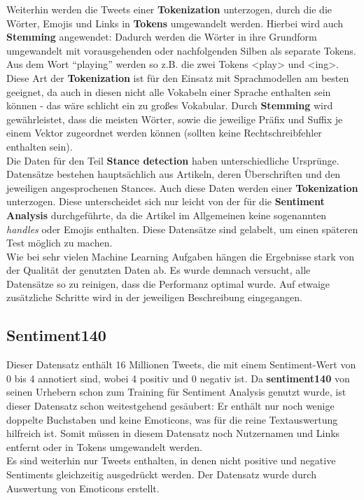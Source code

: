 Weiterhin werden die Tweets einer \textbf{Tokenization} unterzogen, durch die die W\"orter, Emojis und Links in \textbf{Tokens} umgewandelt werden. Hierbei wird auch \textbf{Stemming} angewendet: Dadurch werden die W\"orter in ihre Grundform umgewandelt mit vorausgehenden oder nachfolgenden Silben als separate Tokens. Aus dem Wort "`playing"' werden so z.B. die zwei Tokens <play> und <ing>. Diese Art der \textbf{Tokenization} ist f\"ur den Einsatz mit Sprachmodellen am besten geeignet, da auch in diesen nicht alle Vokabeln einer Sprache enthalten sein k\"onnen - das w\"are schlicht ein zu gro{\ss}es Vokabular. Durch \textbf{Stemming} wird gew\"ahrleistet, dass die meisten W\"orter, sowie die jeweilige Pr\"afix und Suffix je einem Vektor zugeordnet werden k\"onnen (sollten keine Rechtschreibfehler enthalten sein).\\
Die Daten f\"ur den Teil \textbf{Stance detection} haben unterschiedliche Urspr\"unge. Datens\"atze bestehen haupts\"achlich aus Artikeln, deren \"Uberschriften und den jeweiligen angesprochenen Stances. Auch diese Daten werden einer \textbf{Tokenization} unterzogen. Diese unterscheidet sich nur leicht von der f\"ur die \textbf{Sentiment Analysis} durchgef\"uhrte, da die Artikel im Allgemeinen keine sogenannten \textit{handles} oder Emojis enthalten. Diese Datens\"atze sind gelabelt, um einen sp\"ateren Test m\"oglich zu machen.\\
Wie bei sehr vielen Machine Learning Aufgaben h\"angen die Ergebnisse stark von der Qualit\"at der genutzten Daten ab. Es wurde demnach versucht, alle Datens\"atze so zu reinigen, dass die Performanz optimal wurde. Auf etwaige zus\"atzliche Schritte wird in der jeweiligen Beschreibung eingegangen.

\subsection{Sentiment140}
\label{sec:sentiment140}
Dieser Datensatz \cite{sentiment140} enth\"alt 16 Millionen Tweets, die mit einem Sentiment-Wert von 0 bis 4 annotiert sind, wobei 4 positiv und 0 negativ ist. Da \textbf{sentiment140} von seinen Urhebern schon zum Training f\"ur Sentiment Analysis genutzt wurde, ist dieser Datensatz schon weitestgehend ges\"aubert: Er enth\"alt nur noch wenige doppelte Buchstaben und keine Emoticons, was f\"ur die reine Textauswertung hilfreich ist. Somit m\"ussen in diesem Datensatz noch Nutzernamen und Links entfernt oder in Tokens umgewandelt werden.\\
Es sind weiterhin nur Tweets enthalten, in denen nicht positive und negative Sentiments gleichzeitig ausgedr\"uckt werden.
Der Datensatz wurde durch Auswertung von Emoticons erstellt.

